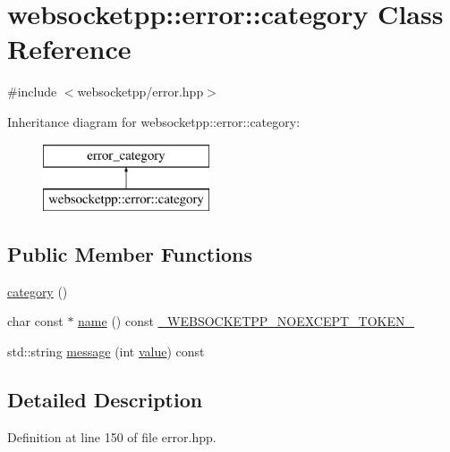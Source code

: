 \hypertarget{classwebsocketpp_1_1error_1_1category}{}\section{websocketpp\+:\+:error\+:\+:category Class Reference}
\label{classwebsocketpp_1_1error_1_1category}


{\ttfamily \#include $<$websocketpp/error.\+hpp$>$}

Inheritance diagram for websocketpp\+:\+:error\+:\+:category\+:\begin{figure}[H]
\begin{center}
\leavevmode
\includegraphics[height=2.000000cm]{classwebsocketpp_1_1error_1_1category}
\end{center}
\end{figure}
\subsection*{Public Member Functions}
\begin{DoxyCompactItemize}
\item 
\hyperlink{classwebsocketpp_1_1error_1_1category_a1bb85c82e564bfc962d1dbaf3e85d1eb}{category} ()
\item 
char const $\ast$ \hyperlink{classwebsocketpp_1_1error_1_1category_a3643effd7e637693fa04394d43c04621}{name} () const \hyperlink{boost__config_8hpp_aa19747404a5f2fe9c9eb9e9d2e48f26c}{\+\_\+\+W\+E\+B\+S\+O\+C\+K\+E\+T\+P\+P\+\_\+\+N\+O\+E\+X\+C\+E\+P\+T\+\_\+\+T\+O\+K\+E\+N\+\_\+}
\item 
std\+::string \hyperlink{classwebsocketpp_1_1error_1_1category_a71e998b98aab647e8b8aab97ae0e513a}{message} (int \hyperlink{namespacewebsocketpp_1_1error_a0558d884e44e79146ad4947aea63f68d}{value}) const 
\end{DoxyCompactItemize}


\subsection{Detailed Description}


Definition at line 150 of file error.\+hpp.



